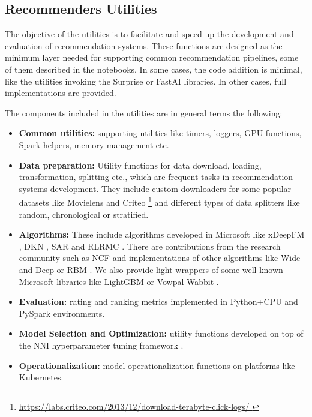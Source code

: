 \subsection{Recommenders Utilities}

The objective of the utilities is to facilitate and speed up the development and evaluation of recommendation systems.
These functions are designed as the minimum layer needed for supporting common recommendation pipelines, some of 
them described in the notebooks. 
In some cases, the code addition is minimal, like the utilities invoking the Surprise \cite{Surprise} or 
FastAI \cite{howard2018fastai} libraries. In other cases, full implementations are provided.

The components included in the utilities are in general terms the following: 
\begin{itemize}
    \item \textbf{Common utilities:} supporting utilities like timers, loggers, GPU functions, 
    Spark helpers, memory management etc.
    \item \textbf{Data preparation:} Utility functions for data download, loading, 
    transformation, splitting etc., which are frequent tasks in recommendation systems development. They include custom downloaders for some
    popular datasets like Movielens \cite{movielens} and Criteo \footnote{\url{https://labs.criteo.com/2013/12/download-terabyte-click-logs/
    }}\label{criteo} and different types of data splitters like random, chronological or
    stratified.     
    \item \textbf{Algorithms:} These include algorithms developed 
    in Microsoft like xDeepFM \cite{lian2018xdeepfm}, DKN \cite{wang2018dkn}, SAR \cite{diev2015sar} and RLRMC \cite{rlrmc}. There are contributions from the research community such as NCF 
    \cite{he2017neural} and implementations
    of other algorithms like Wide and Deep \cite{cheng2016wide} or RBM \cite{salakhutdinov2007restricted}. 
    We also provide light wrappers of some well-known Microsoft
    libraries like LightGBM \cite{ke2017lightgbm} or Vowpal Wabbit \cite{agarwal2014reliable}.
    \item \textbf{Evaluation:} rating and ranking metrics implemented in Python+CPU and PySpark environments.
    \item \textbf{Model Selection and Optimization:} utility functions developed on top of the NNI hyperparameter 
    tuning framework \cite{nni}. 
    \item \textbf{Operationalization:} model operationalization functions on platforms like Kubernetes.
\end{itemize}
    


